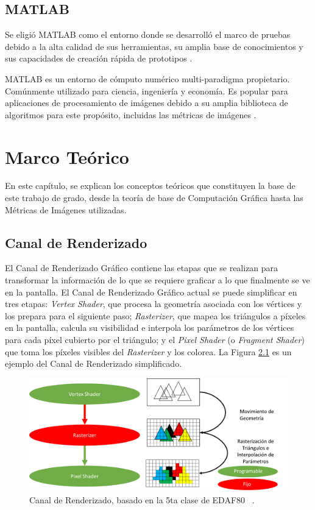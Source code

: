 \documentclass[pregrado]{tesis-usb} %
\begin{document}
\section{MATLAB}
Se eligió MATLAB como el entorno donde se desarrolló el marco de pruebas debido a la alta calidad de sus herramientas, su amplia base de conocimientos y sus capacidades de creación rápida de prototipos \cite{Doggett2017EDAF80, themathworks2018}.

MATLAB es un entorno de cómputo numérico multi-paradigma propietario. Comúnmente utilizado para ciencia, ingeniería y economía. Es popular para aplicaciones de procesamiento de imágenes debido a su amplia biblioteca de algoritmos para este propósito, incluidas las métricas de imágenes \cite{Doggett2017EDAF80, themathworks2018}.



\chapter{Marco Teórico}
En este capítulo, se explican los conceptos teóricos que constituyen la base de este trabajo de grado, desde la teoría de base de Computación Gráfica hasta las Métricas de Imágenes utilizadas.

\section{Canal de Renderizado}
El Canal de Renderizado Gráfico contiene las etapas que se realizan para transformar la información de lo que se requiere graficar a lo que finalmente se ve en la pantalla. El Canal de Renderizado Gráfico actual se puede simplificar en tres etapas: \textit{Vertex Shader}, que procesa la geometría asociada con los vértices y los prepara para el siguiente paso; \textit{Rasterizer}, que mapea los triángulos a píxeles en la pantalla, calcula su visibilidad e interpola los parámetros de los vértices para cada píxel cubierto por el triángulo; y el \textit{Pixel Shader} (o \textit{Fragment Shader}) que toma los píxeles visibles del \textit{Rasterizer} y los colorea. La Figura \ref{fig:graphpipeline} es un ejemplo del Canal de Renderizado simplificado.

\begin{figure}[!hbt]
	\centering
	\includegraphics[scale=0.7]{images/graphics_pipeline.png} 
	\caption{Canal de Renderizado, basado en la 5ta clase de EDAF80 ~\cite{Doggett2017EDAF80}.}\label{fig:graphpipeline}
\end{figure}
\end{document}
